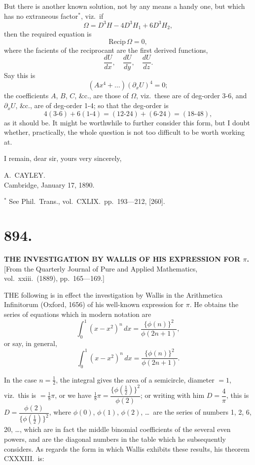 \documentclass[11pt,a4paper]{article}
\begin{document}
But there is another known solution, not by any means a handy one, but which has no extraneous factor$^*$, viz.\ if
\[
\Omega = D^3H - 4D^3H_1 + 6D^3H_2,
\]
then the required equation is
\[
\text{Recip}\,\Omega = 0,
\]
where the facients of the reciprocant are the first derived functions,
\[
\frac{dU}{dx},\quad \frac{dU}{dy},\quad \frac{dU}{dz}.
\]
Say this is
\[
(Ax^4 + \ldots)(\partial_x U)^4 = 0;
\]
the coefficients $A$, $B$, $C$, \&c., are those of $\Omega$, viz.\ these are of deg-order 3-6, and $\partial_x U$, \&c., are of deg-order 1-4; so that the deg-order is
\[
4(3\text{-}6) + 6(1\text{-}4) = (12\text{-}24) + (6\text{-}24) = (18\text{-}48),
\]
as it should be. It might be worthwhile to further consider this form, but I doubt whether, practically, the whole question is not too difficult to be worth working at.

I remain, dear sir, yours very sincerely,

\begin{flushright}
A.\ CAYLEY.\\
Cambridge, January 17, 1890.
\end{flushright}

$^*$ See Phil.\ Trans., vol.\ CXLIX.\ pp.\ 193---212, [260].


\section*{894.}
\begin{center}
{\large\bfseries THE INVESTIGATION BY WALLIS OF HIS EXPRESSION FOR $\pi$.}\\[0.5em]
\small [From the Quarterly Journal of Pure and Applied Mathematics, vol.\ xxiii.\ (1889), pp.\ 165---169.]
\end{center}

THE following is in effect the investigation by Wallis in the Arithmetica Infinitorum (Oxford, 1656) of his well-known expression for $\pi$. He obtains the series of equations which in modern notation are
\[
\int_0^1 (x-x^2)^n\,dx = \frac{\{\phi(n)\}^2}{\phi(2n+1)},
\]
or say, in general,
\[
\int_0^1 (x-x^2)^n\,dx = \frac{\{\phi(n)\}^2}{\phi(2n+1)}.
\]

In the case $n = \tfrac{1}{2}$, the integral gives the area of a semicircle, diameter $=1$, viz.\ this is $= \tfrac{1}{8}\pi$, or we have $\tfrac{1}{8}\pi = \dfrac{\{\phi(\tfrac{1}{2})\}^2}{\phi(2)}$; or writing with him $D = \dfrac{4}{\pi}$, this is $D = \dfrac{\phi(2)}{\{\phi(\tfrac{1}{2})\}^2}$, where $\phi(0)$, $\phi(1)$, $\phi(2)$, \ldots\ are the series of numbers 1, 2, 6, 20, \ldots, which are in fact the middle binomial coefficients of the several even powers, and are the diagonal numbers in the table which he subsequently considers. As regards the form in which Wallis exhibits these results, his theorem CXXXIII.\ is:
\end{document}
